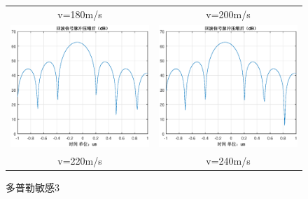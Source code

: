 \documentclass[12pt]{article}
\begin{document}
\begin{figure}[htbp]
\begin{tabular}{cc}
    v=180m/s&v=200m/s\\
  \includegraphics[width=.5\textwidth]{Doppler_sensitivity_0220}&\includegraphics[width=.5\textwidth]{Doppler_sensitivity_0240}\\
    v=220m/s&v=240m/s\\
  \end{tabular}
  \caption{多普勒敏感3}\label{Doppler_sensitivity_0003}
\end{figure}
\end{document}
